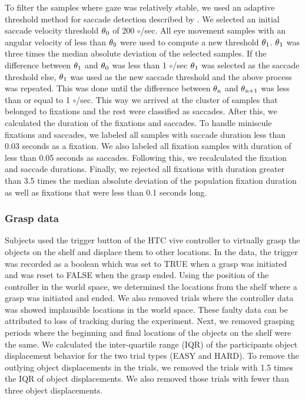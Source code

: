 To filter the samples where gaze was relatively stable, we used an adaptive threshold method for saccade detection described by \citet{Voloh2019-oc}. We selected an initial saccade velocity threshold $\theta\textsubscript{0}$ of 200 $\circ$/sec. All eye movement samples with an angular velocity of less than $\theta\textsubscript{0}$ were used to compute a new threshold $\theta\textsubscript{1}$. $\theta\textsubscript{1}$ was three times the median absolute deviation of the selected samples. If the difference between $\theta\textsubscript{1}$ and $\theta\textsubscript{0}$ was less than 1 $\circ$/sec $\theta\textsubscript{1}$ was selected as the saccade threshold else, $\theta\textsubscript{1}$ was used as the new saccade threshold and the above process was repeated. This was done until the difference between $\theta\textsubscript{n}$ and $\theta\textsubscript{n+1}$ was less than or equal to 1 $\circ$/sec. This way we arrived at the cluster of samples that belonged to fixations and the rest were classified as saccades. After this, we calculated the duration of the fixations and saccades. To handle miniscule fixations and saccades, we labeled all samples with saccade duration less than 0.03 seconds as a fixation. We also labeled all fixation samples with duration of less than 0.05 seconds as saccades. Following this, we recalculated the fixation and saccade durations. Finally, we rejected all fixations with duration greater than 3.5 times the median absolute deviation of the population fixation duration as well as fixations that were less than 0.1 seconds long. 


\subsubsection{Grasp data}

Subjects used the trigger button of the HTC vive controller to virtually grasp the objects on the shelf and displace them to other locations. In the data, the trigger was recorded as a boolean which was set to TRUE when a grasp was initiated and was reset to FALSE when the grasp ended. Using the position of the controller in the world space, we determined the locations from the shelf where a grasp was initiated and ended. We also removed trials where the controller data was showed implausible locations in the world space. These faulty data can be attributed to loss of tracking during the experiment. Next, we removed grasping periods where the beginning and final locations of the objects on the shelf were the same. We calculated the inter-quartile range (IQR) of the participants object displacement behavior for the two trial types (EASY and HARD). To remove the outlying object displacements in the trials, we removed the trials with 1.5 times the IQR of object displacements. We also removed those trials with fewer than three object displacements. 

